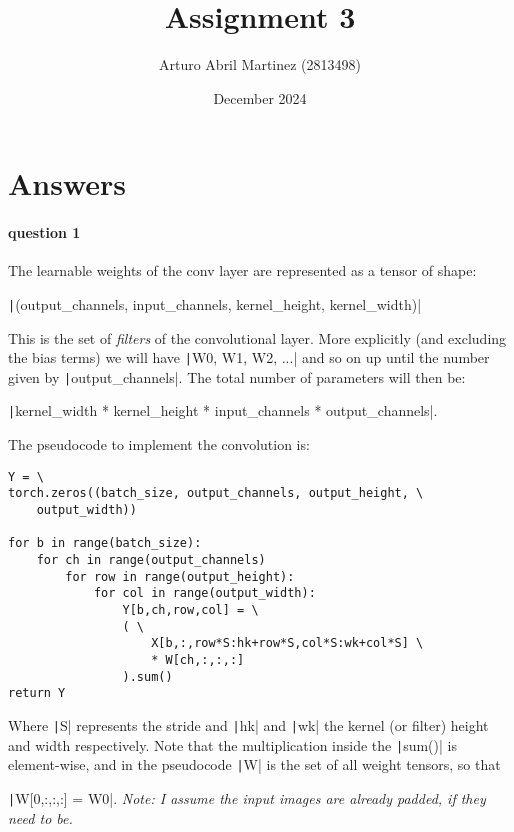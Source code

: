 \documentclass{article}
\title{Assignment 3}
\author{Arturo Abril Martinez (2813498)}
\date{December 2024}
\begin{document}
\maketitle

\section{Answers}

\paragraph{question 1} The learnable weights of the conv layer are represented as a tensor of shape:

\medskip

\noindent \texttt|(output_channels, input_channels, kernel_height, kernel_width)|

\medskip
\noindent This is the set of \emph{filters} of the convolutional layer. More explicitly (and excluding the bias terms) we will have \texttt|W0, W1, W2, ...| and so on up until the number given by \texttt|output_channels|. The total number of parameters will then be: 

\medskip
\noindent \texttt|kernel_width * kernel_height * input_channels * output_channels|. 

\medskip
\noindent The pseudocode to implement the convolution is:

\begin{verbatim}
Y = \
torch.zeros((batch_size, output_channels, output_height, \
    output_width))

for b in range(batch_size):
    for ch in range(output_channels)
        for row in range(output_height):
            for col in range(output_width):
                Y[b,ch,row,col] = \
                ( \
                    X[b,:,row*S:hk+row*S,col*S:wk+col*S] \
                    * W[ch,:,:,:]
                ).sum()
return Y
\end{verbatim}

\noindent Where \texttt|S| represents the stride and \texttt|hk| and \texttt|wk| the kernel (or filter) height and width respectively. Note that the multiplication inside the \texttt|sum()| is element-wise, and in the pseudocode \texttt|W| is the set of all weight tensors, so that 

\noindent \texttt|W[0,:,:,:] = W0|. \emph{Note: I assume the input images are already padded, if they need to be.}
\end{document}
